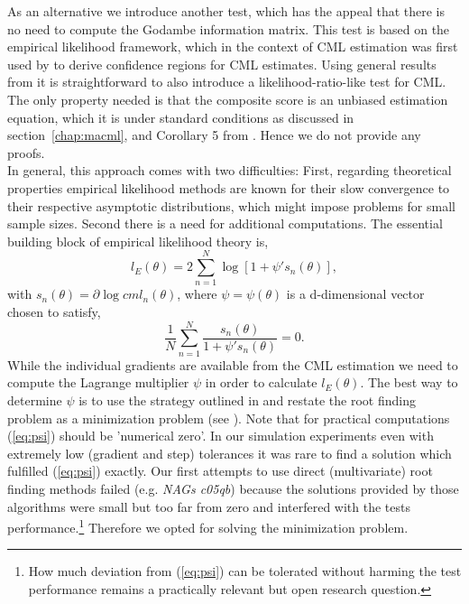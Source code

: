 \documentclass[12pt, a4paper]{article}
\numberwithin{defcounter}{section}
\numberwithin{excounter}{section}
\begin{document}
As an alternative we introduce another test, which has the appeal that there is no need to compute the Godambe information matrix. This test is based on the empirical likelihood framework, which in the context of \ac{CML} estimation was first used by \cite{lunardon2013} to derive confidence regions for \ac{CML} estimates. Using general results from \cite{qin1994} it is straightforward to also introduce a likelihood-ratio-like test for \ac{CML}. The only property needed is that the composite score is an unbiased estimation equation, which it is under standard conditions as discussed in section~\ref{chap:macml}, and Corollary 5 from  \cite{qin1994}. Hence we do not provide any proofs.
\\
In general, this approach comes with two difficulties: First, regarding theoretical properties empirical likelihood methods are known for their slow convergence to their respective asymptotic distributions, which might impose problems for small sample sizes. Second there is a need for additional computations. The essential building block of empirical likelihood theory is,
\begin{equation*}
l_E(\theta) = 2 \sum_{n=1}^N \log[1 + \psi's_n(\theta) ],
\end{equation*}
with $s_n(\theta) = \partial \log cml_n(\theta)$, where $\psi = \psi(\theta)$ is a d-dimensional vector chosen to satisfy,
\begin{equation}
\label{eq:psi}
\frac{1}{N} \sum_{n=1}^{N}\frac{s_n(\theta)}{1+\psi's_n(\theta)} = 0.
\end{equation}
%
While the individual gradients are available from the \ac{CML} estimation we need to compute the Lagrange multiplier $\psi$ in order to calculate $l_E(\theta)$. The best way to determine $\psi$ is to use the strategy outlined in \cite{owen1990} and restate the root finding problem as a minimization problem (see \citep[104ff]{owen1990}). Note that for practical computations (\ref{eq:psi}) should be 'numerical zero'. In our simulation experiments even with extremely low (gradient and step) tolerances it was rare to find a solution which fulfilled (\ref{eq:psi}) exactly. Our first attempts to use direct (multivariate) root finding methods failed (e.g. \textit{NAGs c05qb}) because the solutions provided by those algorithms were small but too far from zero and interfered with the tests performance.\footnote{How much deviation from (\ref{eq:psi}) can be tolerated without harming the test performance remains a practically relevant but open research question.}
Therefore we opted for solving the minimization problem. 
\end{document}
